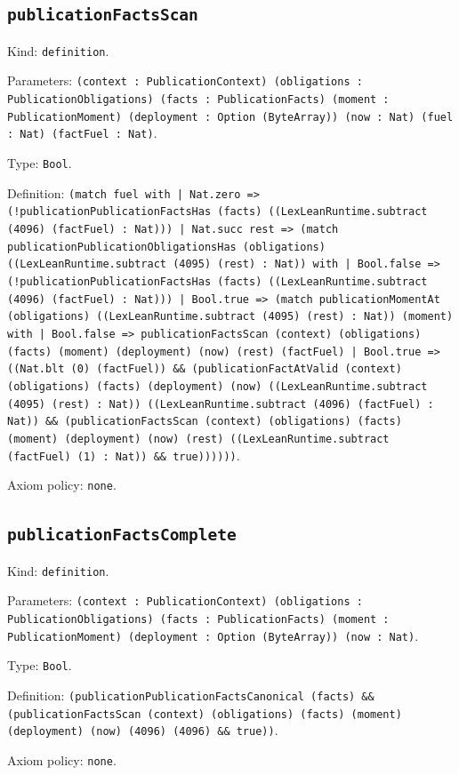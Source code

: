 \documentclass[11pt]{article}
\begin{document}
\subsection*{\texttt{publicationFactsScan}}
\noindent Kind: \texttt{definition}.\par
\noindent Parameters: \texttt{(context : PublicationContext) (obligations : PublicationObligations) (facts : PublicationFacts) (moment : PublicationMoment) (deployment : Option (ByteArray)) (now : Nat) (fuel : Nat) (factFuel : Nat)}.\par
\noindent Type: \texttt{Bool}.\par
\noindent Definition: \texttt{(match fuel with | Nat.zero => (!publicationPublicationFactsHas (facts) ((LexLeanRuntime.subtract (4096) (factFuel) : Nat))) | Nat.succ rest => (match publicationPublicationObligationsHas (obligations) ((LexLeanRuntime.subtract (4095) (rest) : Nat)) with | Bool.false => (!publicationPublicationFactsHas (facts) ((LexLeanRuntime.subtract (4096) (factFuel) : Nat))) | Bool.true => (match publicationMomentAt (obligations) ((LexLeanRuntime.subtract (4095) (rest) : Nat)) (moment) with | Bool.false => publicationFactsScan (context) (obligations) (facts) (moment) (deployment) (now) (rest) (factFuel) | Bool.true => ((Nat.blt (0) (factFuel)) \&\& (publicationFactAtValid (context) (obligations) (facts) (deployment) (now) ((LexLeanRuntime.subtract (4095) (rest) : Nat)) ((LexLeanRuntime.subtract (4096) (factFuel) : Nat)) \&\& (publicationFactsScan (context) (obligations) (facts) (moment) (deployment) (now) (rest) ((LexLeanRuntime.subtract (factFuel) (1) : Nat)) \&\& true))))))}.\par
\noindent Axiom policy: \texttt{none}.\par
\subsection*{\texttt{publicationFactsComplete}}
\noindent Kind: \texttt{definition}.\par
\noindent Parameters: \texttt{(context : PublicationContext) (obligations : PublicationObligations) (facts : PublicationFacts) (moment : PublicationMoment) (deployment : Option (ByteArray)) (now : Nat)}.\par
\noindent Type: \texttt{Bool}.\par
\noindent Definition: \texttt{(publicationPublicationFactsCanonical (facts) \&\& (publicationFactsScan (context) (obligations) (facts) (moment) (deployment) (now) (4096) (4096) \&\& true))}.\par
\noindent Axiom policy: \texttt{none}.\par
\end{document}
